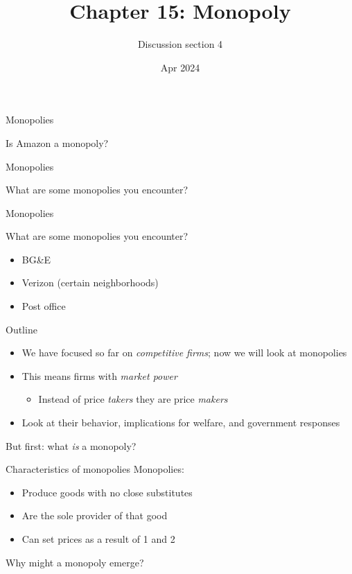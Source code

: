 \documentclass[aspectratio=169]{beamer}
\title{Chapter 15: Monopoly}
\author{Discussion section 4}
\date{Apr 2024}
\begin{document}
\begin{frame}
    \titlepage 
\end{frame}

\begin{frame}{Monopolies}
    \begin{center}
        Is Amazon a monopoly?
    \end{center}
\end{frame}

\begin{frame}{Monopolies}
        \begin{center}
            What are some monopolies you encounter?
        \end{center}
\end{frame}

\begin{frame}{Monopolies}
    \begin{center}
        What are some monopolies you encounter?
    \end{center}
    \begin{itemize}
        \item BG\&E
        \item Verizon (certain neighborhoods)
        \item Post office
    \end{itemize}
\end{frame}

\begin{frame}{Outline}
    \begin{itemize}
        \item We have focused so far on \textit{competitive firms}; now we will look at monopolies
        \item This means firms with \textit{market power}
        \begin{itemize}
            \item Instead of price \textit{takers} they are price \textit{makers}
        \end{itemize}
        \item Look at their behavior, implications for welfare, and government responses
    \end{itemize}

    \vspace{5mm}

    But first: what \textit{is} a monopoly?
\end{frame}

\begin{frame}{Characteristics of monopolies}
    Monopolies:
    \begin{itemize}
        \item Produce goods with no close substitutes
        \item Are the sole provider of that good
        \item Can set prices as a result of 1 and 2
    \end{itemize}

    \vspace{5mm}

    Why might a monopoly emerge?
\end{frame}
\end{document}
